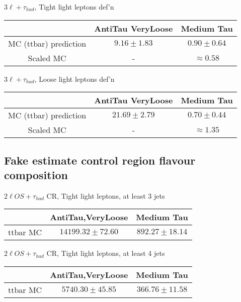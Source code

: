 \documentclass[11pt]{article}
\begin{document}
	$3\ell+\tau_{had}$, Tight light leptons def'n
	\begin{table}[h!]
		\begin{tabular}{|c|c|c|}
			\hline 
			                   & AntiTau VeryLoose & Medium Tau \\
			 \hline
			 MC (ttbar) prediction &         $9.16 \pm 1.83$        & $0.90 \pm 0.64$     \\
			 Scaled MC                &     -         & $\approx 0.58$     \\  
			\hline 
		\end{tabular}
	\end{table}%

	$3\ell+\tau_{had}$, Loose light leptons def'n
	\begin{table}[h!]
		\begin{tabular}{|c|c|c|}
			\hline 
			                   & AntiTau VeryLoose & Medium Tau \\
			 \hline
			 MC (ttbar) prediction &         $21.69 \pm 2.79$        & $0.70 \pm 0.44$     \\
			 Scaled MC                &       -       &   $\approx 1.35$   \\  
			\hline 
		\end{tabular}
	\end{table}%

		\newpage
		\subsection{Fake estimate control region flavour composition} 
		$2\ell OS+\tau_{had}$ CR, Tight light leptons, at least 3 jets 
	\begin{table}[h!]
		\begin{tabular}{|c|c|c|}
			\hline 
			  & AntiTau,VeryLoose & Medium Tau \\
			 \hline
			 ttbar MC & $14199.32 \pm 72.60$   & $892.27 \pm 18.14$     \\
			\hline 
		\end{tabular}
	\end{table}%

		$2\ell OS+\tau_{had}$ CR, Tight light leptons, at least 4 jets
	\begin{table}[h!]
		\begin{tabular}{|c|c|c|}
			\hline 
			  & AntiTau,VeryLoose & Medium Tau \\
			 \hline
			 ttbar MC & $5740.30 \pm 45.85$        & $366.76 \pm 11.58$     \\
			\hline 
		\end{tabular}
	\end{table}%
\end{document}
